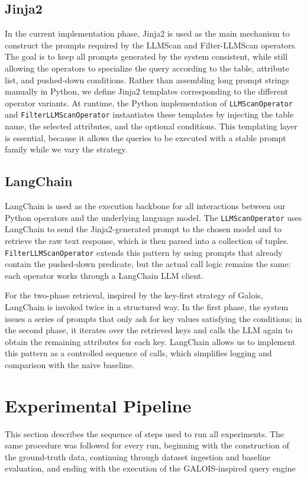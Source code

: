 \documentclass[12pt]{article}
\begin{document}
\subsection{Jinja2}

In the current implementation phase, Jinja2 is used as the main mechanism to construct the prompts required by the LLMScan and Filter-LLMScan operators. The goal is to keep all prompts generated by the system consistent, while still allowing the operators to specialize the query according to the table, attribute list, and pushed-down conditions. Rather than assembling long prompt strings manually in Python, we define Jinja2 templates corresponding to the different operator variants. At runtime, the Python implementation of \texttt{LLMScanOperator} and \texttt{FilterLLMScanOperator} instantiates these templates by injecting the table name, the selected attributes, and the optional conditions. This templating layer is essential, because it allows the queries to be executed with a stable prompt family while we vary the strategy.

\subsection{LangChain}

LangChain is used as the execution backbone for all interactions between our Python operators and the underlying language model. The \texttt{LLMScanOperator} uses LangChain to send the Jinja2-generated prompt to the chosen model and to retrieve the raw text response, which is then parsed into a collection of tuples. \texttt{FilterLLMScanOperator} extends this pattern by using prompts that already contain the pushed-down predicate, but the actual call logic remains the same: each operator works through a LangChain LLM client.

For the two-phase retrieval, inspired by the key-first strategy of Galois, LangChain is invoked twice in a structured way. In the first phase, the system issues a series of prompts that only ask for key values satisfying the conditions; in the second phase, it iterates over the retrieved keys and calls the LLM again to obtain the remaining attributes for each key. LangChain allows us to implement this pattern as a controlled sequence of calls, which simplifies logging and comparison with the naive baseline.





\section{Experimental Pipeline}
This section describes the sequence of steps used to run all experiments. The same procedure was followed for every run, beginning with the construction of the ground-truth data, continuing through dataset ingestion and baseline evaluation, and ending with the execution of the GALOIS-inspired query engine
\end{document}
